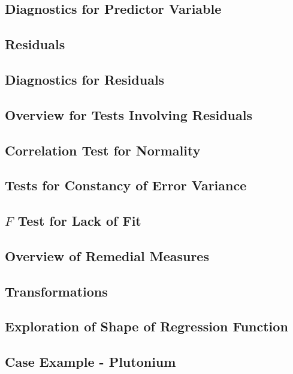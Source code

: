 \subsection{Diagnostics for Predictor Variable}

\subsection{Residuals}

\subsection{Diagnostics for Residuals}

\subsection{Overview for Tests Involving Residuals}

\subsection{Correlation Test for Normality}

\subsection{Tests for Constancy of Error Variance}

\subsection{$F$ Test for Lack of Fit}

\subsection{Overview of Remedial Measures}

\subsection{Transformations}

\subsection{Exploration of Shape of Regression Function}

\subsection{Case Example - Plutonium}


